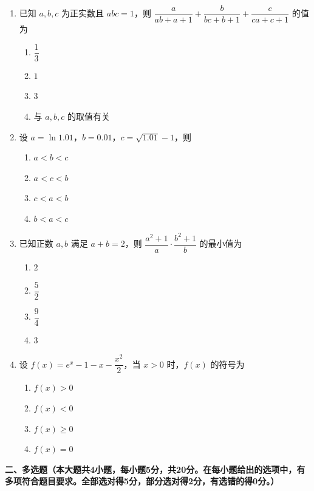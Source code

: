 \documentclass[12pt, a4paper]{ctexart}
\newcommand{\score}[1]{\hfill\makebox[2cm][l]{(#1分)}}
\begin{document}
\begin{enumerate}
\item 已知 $a, b, c$ 为正实数且 $abc = 1$，则 $\dfrac{a}{ab + a + 1} + \dfrac{b}{bc + b + 1} + \dfrac{c}{ca + c + 1}$ 的值为\score{5}
\begin{enumerate}[label=\Alph*.]
\item $\dfrac{1}{3}$
\item $1$
\item $3$
\item 与 $a, b, c$ 的取值有关
\end{enumerate}

\item 设 $a = \ln 1.01$，$b = 0.01$，$c = \sqrt{1.01} - 1$，则\score{5}
\begin{enumerate}[label=\Alph*.]
\item $a < b < c$
\item $a < c < b$
\item $c < a < b$
\item $b < a < c$
\end{enumerate}

\item 已知正数 $a, b$ 满足 $a + b = 2$，则 $\dfrac{a^2 + 1}{a} \cdot \dfrac{b^2 + 1}{b}$ 的最小值为\score{5}
\begin{enumerate}[label=\Alph*.]
\item $2$
\item $\dfrac{5}{2}$
\item $\dfrac{9}{4}$
\item $3$
\end{enumerate}

\item 设 $f(x) = e^x - 1 - x - \dfrac{x^2}{2}$，当 $x > 0$ 时，$f(x)$ 的符号为\score{5}
\begin{enumerate}[label=\Alph*.]
\item $f(x) > 0$
\item $f(x) < 0$
\item $f(x) \geqslant 0$
\item $f(x) = 0$
\end{enumerate}

\end{enumerate}

\vspace{0.5cm}

\noindent\textbf{二、多选题（本大题共4小题，每小题5分，共20分。在每小题给出的选项中，有多项符合题目要求。全部选对得5分，部分选对得2分，有选错的得0分。）}

\vspace{0.3cm}
\end{document}
